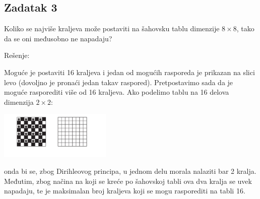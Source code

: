 \documentclass[a4paper,12pt]{article}
\begin{document}
\subsection*{Zadatak 3}
Koliko se najviše kraljeva može postaviti na šahovsku tablu dimenzije \(8 \times 8\), tako da se oni međusobno ne napadaju?

Rešenje:

Moguće je postaviti 16 kraljeva i jedan od mogućih rasporeda je prikazan na slici levo (dovoljno je pronaći jedan takav raspored).  
Pretpostavimo sada da je moguće rasporediti više od 16 kraljeva. Ako podelimo tablu na 16 delova dimenzija \(2 \times 2\):

\begin{center}
\includegraphics[width=0.4\textwidth]{sahovska_tabla.png}
\end{center}

onda bi se, zbog Dirihleovog principa, u jednom delu morala nalaziti bar 2 kralja. Međutim, zbog načina na koji se kreće po šahovskoj tabli ova dva kralja se uvek napadaju, te je maksimalan broj kraljeva koji se mogu rasporediti na tabli 16.
\end{document}
